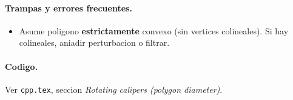 \paragraph{Trampas y errores frecuentes.}
\begin{itemize}\setlength\itemsep{0pt}
	\item Asume poligono \textbf{estrictamente} convexo (sin vertices colineales). Si hay colineales, aniadir perturbacion o filtrar.
\end{itemize}

\paragraph{Codigo.}
Ver \texttt{cpp.tex}, seccion \textit{Rotating calipers (polygon diameter)}.

